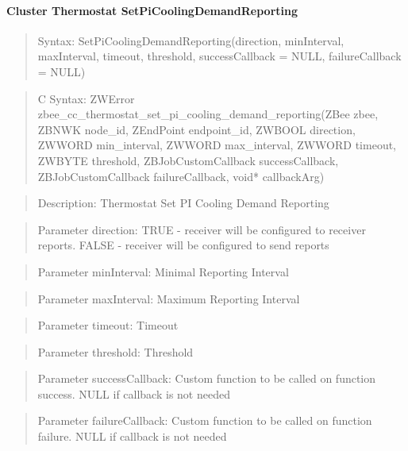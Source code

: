 \paragraph{Cluster Thermostat SetPiCoolingDemandReporting}
\begin{quote}Syntax: SetPiCoolingDemandReporting(direction, minInterval, maxInterval, timeout, threshold, successCallback = NULL, failureCallback = NULL)\end{quote}
\begin{quote}C Syntax: ZWError zbee\_cc\_thermostat\_set\_pi\_cooling\_demand\_reporting(ZBee zbee, ZBNWK node\_id, ZEndPoint endpoint\_id, ZWBOOL direction, ZWWORD min\_interval, ZWWORD max\_interval, ZWWORD timeout, ZWBYTE threshold, ZBJobCustomCallback successCallback, ZBJobCustomCallback failureCallback, void* callbackArg)\end{quote}
\begin{quote}Description: Thermostat Set PI Cooling Demand Reporting\end{quote}
\begin{quote}Parameter direction: TRUE  - receiver will be configured to receiver reports. FALSE - receiver will be configured to send reports\end{quote}
\begin{quote}Parameter minInterval: Minimal Reporting Interval\end{quote}
\begin{quote}Parameter maxInterval: Maximum Reporting Interval\end{quote}
\begin{quote}Parameter timeout: Timeout\end{quote}
\begin{quote}Parameter threshold: Threshold\end{quote}
\begin{quote}Parameter successCallback: Custom function to be called on function success. NULL if callback is not needed\end{quote}
\begin{quote}Parameter failureCallback: Custom function to be called on function failure. NULL if callback is not needed\end{quote}


